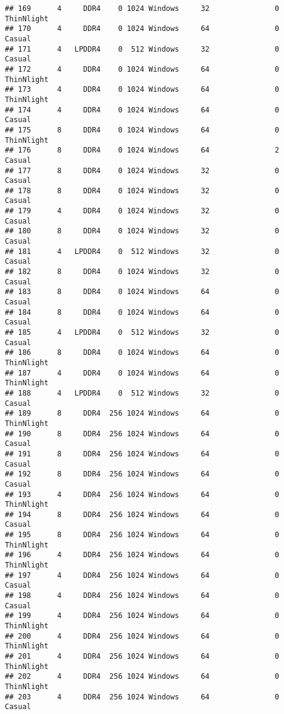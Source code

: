 \documentclass[
]{article}
\begin{document}
\begin{verbatim}
## 169      4     DDR4    0 1024 Windows     32               0 ThinNlight
## 170      4     DDR4    0 1024 Windows     64               0     Casual
## 171      4   LPDDR4    0  512 Windows     32               0     Casual
## 172      4     DDR4    0 1024 Windows     64               0 ThinNlight
## 173      4     DDR4    0 1024 Windows     64               0 ThinNlight
## 174      4     DDR4    0 1024 Windows     64               0     Casual
## 175      8     DDR4    0 1024 Windows     64               0 ThinNlight
## 176      8     DDR4    0 1024 Windows     64               2     Casual
## 177      8     DDR4    0 1024 Windows     32               0     Casual
## 178      8     DDR4    0 1024 Windows     32               0     Casual
## 179      4     DDR4    0 1024 Windows     32               0     Casual
## 180      8     DDR4    0 1024 Windows     32               0     Casual
## 181      4   LPDDR4    0  512 Windows     32               0     Casual
## 182      8     DDR4    0 1024 Windows     32               0     Casual
## 183      8     DDR4    0 1024 Windows     64               0     Casual
## 184      8     DDR4    0 1024 Windows     64               0     Casual
## 185      4   LPDDR4    0  512 Windows     32               0     Casual
## 186      8     DDR4    0 1024 Windows     64               0 ThinNlight
## 187      4     DDR4    0 1024 Windows     64               0 ThinNlight
## 188      4   LPDDR4    0  512 Windows     32               0     Casual
## 189      8     DDR4  256 1024 Windows     64               0 ThinNlight
## 190      8     DDR4  256 1024 Windows     64               0     Casual
## 191      8     DDR4  256 1024 Windows     64               0     Casual
## 192      8     DDR4  256 1024 Windows     64               0     Casual
## 193      4     DDR4  256 1024 Windows     64               0 ThinNlight
## 194      8     DDR4  256 1024 Windows     64               0     Casual
## 195      8     DDR4  256 1024 Windows     64               0 ThinNlight
## 196      4     DDR4  256 1024 Windows     64               0 ThinNlight
## 197      4     DDR4  256 1024 Windows     64               0     Casual
## 198      4     DDR4  256 1024 Windows     64               0     Casual
## 199      4     DDR4  256 1024 Windows     64               0 ThinNlight
## 200      4     DDR4  256 1024 Windows     64               0 ThinNlight
## 201      4     DDR4  256 1024 Windows     64               0 ThinNlight
## 202      4     DDR4  256 1024 Windows     64               0 ThinNlight
## 203      4     DDR4  256 1024 Windows     64               0     Casual

\end{verbatim}
\end{document}
